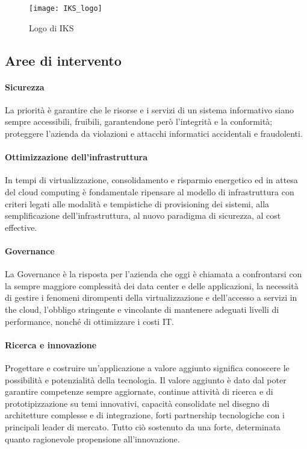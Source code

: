 \begin{figure}[H] 
    \centering 
    \texttt{[image: IKS\_logo]} 
    \caption{Logo di IKS}
\end{figure}

\subsection{Aree di intervento}
\paragraph{Sicurezza}
La priorità è garantire che le risorse e i servizi di un sistema informativo siano sempre accessibili, fruibili, garantendone però l’integrità e la conformità; proteggere l’azienda da violazioni e attacchi informatici accidentali e fraudolenti.

\paragraph{Ottimizzazione dell'infrastruttura}
In tempi di virtualizzazione, consolidamento e risparmio energetico ed in attesa del cloud computing è fondamentale ripensare al modello di infrastruttura con criteri legati alle modalità e tempistiche di provisioning dei sistemi, alla semplificazione dell’infrastruttura, al nuovo paradigma di sicurezza, al cost effective.

\paragraph{Governance}
La Governance è la risposta per l’azienda che oggi è chiamata a confrontarsi con la sempre maggiore complessità dei data center e delle applicazioni, la necessità di gestire i fenomeni dirompenti della virtualizzazione e dell’accesso a servizi in the cloud, l’obbligo stringente e vincolante di mantenere adeguati livelli di performance, nonché di ottimizzare i costi IT.

\paragraph{Ricerca e innovazione}
Progettare e costruire un’applicazione a valore aggiunto significa conoscere le possibilità e potenzialità della tecnologia. Il valore aggiunto è dato dal poter garantire competenze sempre aggiornate, continue attività di ricerca e di prototipizzazione su temi innovativi, capacità consolidate nel disegno di architetture complesse e di integrazione, forti partnership tecnologiche con i principali leader di mercato. Tutto ciò sostenuto da una forte, determinata quanto ragionevole propensione all’innovazione.

